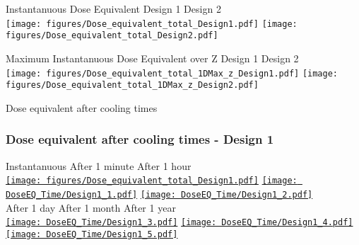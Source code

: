 \documentclass[xcolor={dvipsnames}]{beamer}
\begin{document}
\begin{frame}{Instantanuous Dose Equivalent}
\centering
\hspace*{1.8cm} Design 1 \hfill Design 2 \hspace*{1.8cm} \\
  \texttt{[image: figures/Dose\_equivalent\_total\_Design1.pdf]}
    \texttt{[image: figures/Dose\_equivalent\_total\_Design2.pdf]}
\end{frame}
\begin{frame}{Maximum Instantanuous Dose Equivalent over Z}
\centering
\hspace*{1.8cm} Design 1 \hfill Design 2 \hspace*{1.8cm} \\
  \texttt{[image: figures/Dose\_equivalent\_total\_1DMax\_z\_Design1.pdf]}
    \texttt{[image: figures/Dose\_equivalent\_total\_1DMax\_z\_Design2.pdf]}
\end{frame}
\begin{frame}{Dose equivalent after cooling times}
  \begin{center}
  \end{center}
\end{frame}
\begin{frame}
  \frametitle{Dose equivalent after cooling times - Design 1}
  \hypertarget{coolingtimesprev_Design1}{}
  \centering
    \hspace*{1.2cm} Instantanuous \hfill After 1 minute \hfill After 1 hour \hspace*{1.5cm} \\
  \hyperlink{Dose_equivalent_Design1}{\texttt{[image: figures/Dose\_equivalent\_total\_Design1.pdf]}}
  \hyperlink{Dose_equivalent_minute_Design1}{\texttt{[image: DoseEQ\_Time/Design1\_1.pdf]}}
  \hyperlink{Dose_equivalent_hour_Design1}{\texttt{[image: DoseEQ\_Time/Design1\_2.pdf]}}\\
    \hspace*{1.2cm} After 1 day \hfill After 1 month \hfill After 1 year\hspace*{1.5cm} \\
  \hyperlink{Dose_equivalent_day_Design1}{\texttt{[image: DoseEQ\_Time/Design1\_3.pdf]}}
  \hyperlink{Dose_equivalent_month_Design1}{\texttt{[image: DoseEQ\_Time/Design1\_4.pdf]}}
  \hyperlink{Dose_equivalent_year_Design1}{\texttt{[image: DoseEQ\_Time/Design1\_5.pdf]}}
\end{frame}
\end{document}
